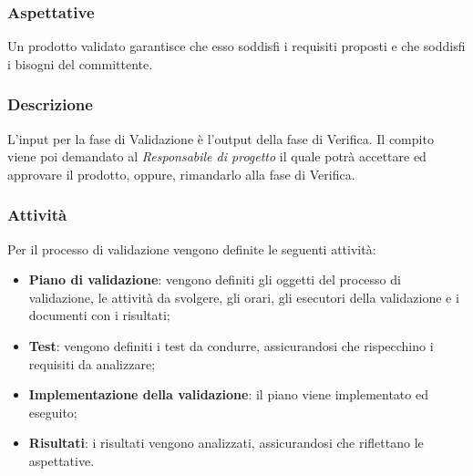 	\subsubsection{Aspettative}
		Un prodotto validato garantisce che esso soddisfi i requisiti proposti e che soddisfi i bisogni del committente.
	
	\subsubsection{Descrizione}
	L'input per la fase di Validazione è l'output della fase di Verifica. Il compito viene poi demandato al \textit{Responsabile di progetto} il quale potrà accettare ed approvare il prodotto, oppure, rimandarlo alla fase di Verifica.
	\subsubsection{Attività}
	Per il processo di validazione vengono definite le seguenti attività:
	\begin{itemize}
	    \item \textbf{Piano di validazione}: vengono definiti gli oggetti del processo di validazione, le attività da svolgere, gli orari, gli esecutori della validazione e i documenti con i risultati;
	    \item \textbf{Test}: vengono definiti i test da condurre, assicurandosi che rispecchino i requisiti da analizzare;
	    \item \textbf{Implementazione della validazione}: il piano viene implementato ed eseguito;
	    \item \textbf{Risultati}: i risultati vengono analizzati, assicurandosi che riflettano le aspettative.
	\end{itemize}
	
